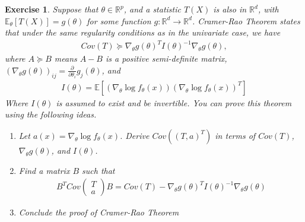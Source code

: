 \documentclass[12pt]{article}
\theoremstyle{colon}
\newtheorem{exercise}{Exercise}
\begin{document}
\clearpage

\begin{exercise}
  Suppose that $\theta \in \mathbb{R}^p$, and a statistic $T(X)$ is also in $\mathbb{R}^d$, with $\mathbb{E}_\theta[T(X)] = g(\theta)$ for some function $g: \mathbb{R}^d \rightarrow \mathbb{R}^d$. Cramer-Rao Theorem states that under the same regularity conditions as in the univariate case, we have
  \begin{gather*}
    Cov(T) \succeq \nabla_\theta g(\theta)^T I(\theta)^{-1} \nabla_\theta g(\theta),
  \end{gather*}
  where $A \succeq B$ means $A-B$ is a positive semi-definite matrix, $(\nabla_\theta g(\theta))_{ij} = \frac{\partial}{\partial \theta_i} g_j(\theta)$, and
  \begin{gather*}
    I(\theta) = \mathbb{E}[(\nabla_\theta \log f_\theta(x))(\nabla_\theta \log f_\theta(x))^T]
  \end{gather*}
  Where $I(\theta)$ is assumed to exist and be invertible.
  You can prove this theorem using the following ideas.
  \begin{enumerate}[label=\arabic*)]
    \item Let $a(x) = \nabla_\theta \log f_\theta(x)$. Derive $Cov((T,a)^T)$ in terms of $Cov(T)$, $\nabla_\theta g(\theta)$, and $I(\theta)$.
    \item Find a matrix $B$ such that
      \begin{gather*}
        B^T Cov \begin{pmatrix} T \\ a \end{pmatrix} B = Cov(T) - \nabla_\theta g(\theta)^T I(\theta)^{-1} \nabla_\theta g(\theta)
      \end{gather*}
    \item Conclude the proof of Cramer-Rao Theorem
  \end{enumerate}
\end{exercise}
\end{document}
